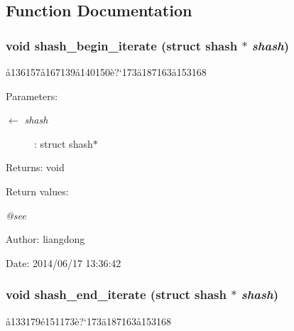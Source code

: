 \subsection{Function Documentation}
\subsubsection{\setlength{\rightskip}{0pt plus 5cm}void shash\_\-begin\_\-iterate (struct shash $\ast$ {\em shash})}\label{shash_8c_a11}


\aa{}136157\aa{}167139\aa{}140150\`{e}?`173\"{a}187163\aa{}153168 

\begin{Desc}
\item[Parameters:]
\begin{description}
\item[\mbox{$\leftarrow$} {\em shash}]: struct shash$\ast$ \end{description}
\end{Desc}
\begin{Desc}
\item[Returns:]void \end{Desc}
\begin{Desc}
\item[Return values:]
\begin{description}
\item[{\em @see}]\end{description}
\end{Desc}
\begin{Desc}
\item[Author:]liangdong \end{Desc}
\begin{Desc}
\item[Date:]2014/06/17 13:36:42 \end{Desc}
\subsubsection{\setlength{\rightskip}{0pt plus 5cm}void shash\_\-end\_\-iterate (struct shash $\ast$ {\em shash})}\label{shash_8c_a13}


\aa{}133179\'{e}151173\`{e}?`173\"{a}187163\aa{}153168 

